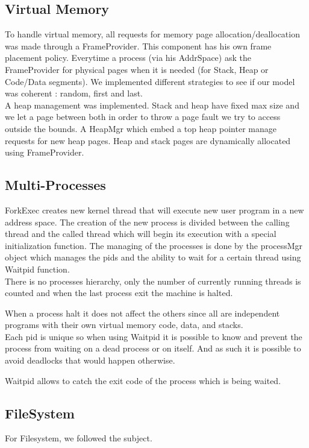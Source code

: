 \subsection{Virtual Memory}

To handle virtual memory, all requests for memory page allocation/deallocation
was made through a FrameProvider. This component has his own frame placement
policy. Everytime a process (via his AddrSpace) ask the FrameProvider for
physical pages when it is needed (for Stack, Heap or Code/Data segments).
We implemented different strategies to see if our model was coherent : random,
first and last.\\

A heap management was implemented. Stack and heap have fixed max size and
we let a page between both in order to throw a page fault we try to access
outside the bounds. A HeapMgr which embed a top heap pointer manage requests for
new heap pages.
Heap and stack pages are dynamically allocated using FrameProvider.

\subsection{Multi-Processes}
ForkExec creates new kernel thread that will execute new user program in a new
address space. The creation of the new process is divided between the calling
thread and the called thread which will begin its execution with a special
initialization function. The managing of the processes is done by the processMgr
object which manages the pids and the ability to wait for a certain thread using
Waitpid function.\\

There is no processes hierarchy, only the number of currently running threads is
counted and when the last process exit the machine is halted.

When a process halt it does not affect the others since all are independent
programs with their own virtual memory code, data, and stacks.\\

Each pid is unique so when using Waitpid it is possible to know and prevent the
process from waiting on a dead process or on itself. And as such it is possible
to avoid deadlocks that would happen otherwise.

Waitpid allows to catch the exit code of the process which is being waited.

\subsection{FileSystem}
For Filesystem, we followed the subject.

